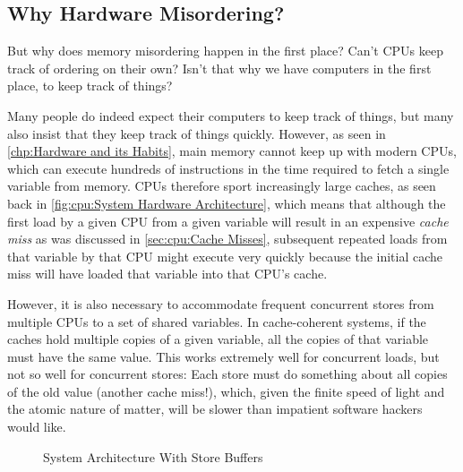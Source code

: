 \subsection{Why Hardware Misordering?}
\label{sec:memorder:Why Hardware Misordering?}

But why does memory misordering happen in the first place?
Can't CPUs keep track of ordering on their own?
Isn't that why we have computers in the first place, to keep track of things?

Many people do indeed expect their computers to keep track of things,
but many also insist that they keep track of things quickly.
However, as seen in \cref{chp:Hardware and its Habits},
main memory cannot keep up with modern CPUs, which can execute
hundreds of instructions in the time required to fetch a single variable
from memory.
CPUs therefore sport increasingly large caches, as seen back in
\cref{fig:cpu:System Hardware Architecture}, which means that
although the first load by a given CPU from a given variable will
result in an expensive \emph{cache miss} as was discussed in
\cref{sec:cpu:Cache Misses}, subsequent
repeated loads from that variable by that CPU might execute
very quickly because the initial cache miss will have loaded that
variable into that CPU's cache.

However, it is also necessary to accommodate frequent concurrent stores
from multiple CPUs to a set of shared variables.
In cache-coherent systems, if the caches hold multiple copies of a given
variable, all the copies of that variable must have the same value.
This works extremely well for concurrent loads, but not so well for
concurrent stores:
Each store must do something about all copies of the old value
(another cache miss!), which, given the finite speed of light and
the atomic nature of matter, will be slower than impatient software
hackers would like.

\begin{figure}
\centering
{}
\caption{System Architecture With Store Buffers}
\label{fig:memorder:System Architecture With Store Buffers}
\end{figure}

